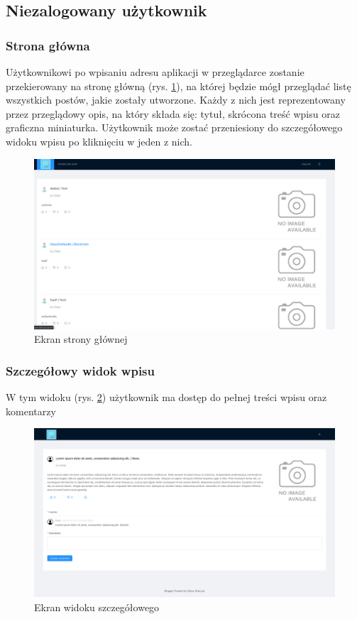 \documentclass[declaration,shortabstract]{iithesis}
\begin{document}
\subsection{Niezalogowany użytkownik}
\subsubsection{Strona główna}
Użytkownikowi po wpisaniu adresu aplikacji w przeglądarce zostanie przekierowany na stronę główną (rys. \ref{fig:main_page}), na której będzie mógł przeglądać listę wszystkich postów, jakie zostały utworzone. Każdy z nich jest reprezentowany przez przeglądowy opis, na który składa się: tytuł, skrócona treść wpisu oraz graficzna miniaturka. Użytkownik może zostać przeniesiony do szczegółowego widoku wpisu po kliknięciu w jeden z nich.

\begin{figure}
    \centering
    \includegraphics[width=\textwidth]{images/stronaglowna.png}
    \caption{Ekran strony głównej}
    \label{fig:main_page}
\end{figure}

\subsubsection{Szczegółowy widok wpisu}
W tym widoku (rys. \ref{fig:post_view}) użytkownik ma dostęp do pełnej treści wpisu oraz komentarzy

\begin{figure}
    \centering
    \includegraphics[width=\textwidth]{images/widok_postu.png}
    \caption{Ekran widoku szczegółowego}
    \label{fig:post_view}
\end{figure}
\end{document}
